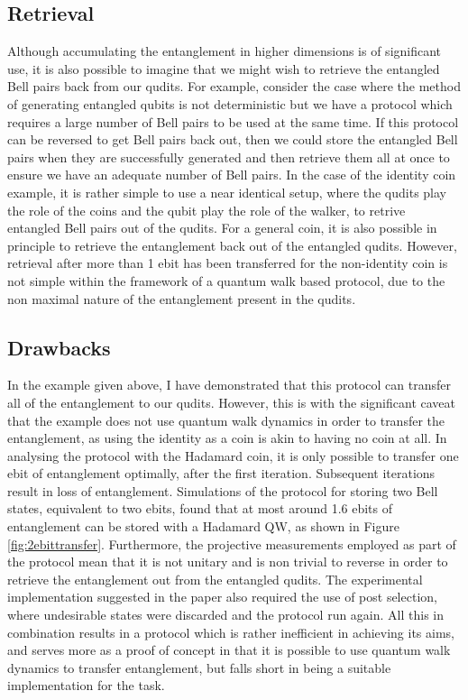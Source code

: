 \subsection{Retrieval}
\label{subsection:qw_retrieval}
Although accumulating the entanglement in higher dimensions is of significant use, it is also possible to imagine that we might wish to retrieve the entangled Bell pairs back from our qudits.
For example, consider the case where the method of generating entangled qubits is not deterministic but we have a protocol which requires a large number of Bell pairs to be used at the same time.
If this protocol can be reversed to get Bell pairs back out, then we could store the entangled Bell pairs when they are successfully generated and then retrieve them all at once to ensure we have an adequate number of Bell pairs.
In the case of the identity coin example, it is rather simple to use a near identical setup, where the qudits play the role of the coins and the qubit play the role of the walker, to retrive entangled Bell pairs out of the qudits.
For a general coin, it is also possible in principle to retrieve the entanglement back out of the entangled qudits.
However, retrieval after more than 1 ebit has been transferred for the non-identity coin is not simple within the framework of a quantum walk based protocol, due to the non maximal nature of the entanglement present in the qudits.

\subsection{Drawbacks}
In the example given above, I have demonstrated that this protocol can transfer all of the entanglement to our qudits.
However, this is with the significant caveat that the example does not use quantum walk dynamics in order to transfer the entanglement, as using the identity as a coin is akin to having no coin at all.
In analysing the protocol with the Hadamard coin, it is only possible to transfer one ebit of entanglement optimally, after the first iteration. Subsequent iterations result in loss of entanglement.
Simulations of the protocol for storing two Bell states, equivalent to two ebits, found that at most around 1.6 ebits of entanglement can be stored with a Hadamard QW, as shown in Figure \ref{fig:2ebittransfer}.
Furthermore, the projective measurements employed as part of the protocol mean that it is not unitary and is non trivial to reverse in order to retrieve the entanglement out from the entangled qudits.
The experimental implementation suggested in the paper also required the use of post selection, where undesirable states were discarded and the protocol run again.
All this in combination results in a protocol which is rather inefficient in achieving its aims, and serves more as a proof of concept in that it is possible to use quantum walk dynamics to transfer entanglement, but falls short in being a suitable implementation for the task.

